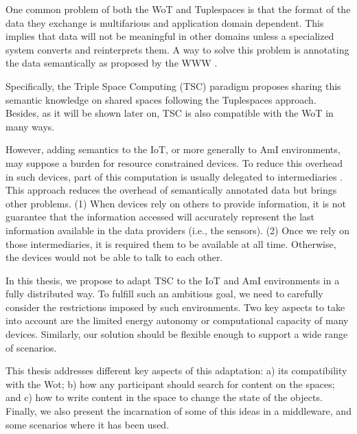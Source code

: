 \medskip

One common problem of both the WoT and Tuplespaces is that the format of the data they exchange is multifarious and application domain dependent.
This implies that data will not be meaningful in other domains unless a specialized system converts and reinterprets them.
A way to solve this problem is annotating the data semantically as proposed by the WWW \cite{berners-lee_semantic_2001}.

Specifically, the Triple Space Computing (TSC) paradigm proposes sharing this semantic knowledge on shared spaces following the Tuplespaces approach.
Besides, as it will be shown later on, TSC is also compatible with the WoT in many ways.

However, adding semantics to the IoT, or more generally to AmI environments, may suppose a burden for resource constrained devices.
To reduce this overhead in such devices, part of this computation is usually delegated to intermediaries \cite{honkola_smart-m3_2010}. %
This approach reduces the overhead of semantically annotated data but brings other problems.
(1) When devices rely on others to provide information, it is not guarantee that the information accessed will accurately represent the last information available in the data providers (i.e., the sensors).
(2) Once we rely on those intermediaries, it is required them to be available at all time.
Otherwise, the devices would not be able to talk to each other.

In this thesis, we propose to adapt TSC to the IoT and AmI environments in a fully distributed way.
To fulfill such an ambitious goal, we need to carefully consider the restrictions imposed by such environments.
Two key aspects to take into account are the limited energy autonomy or computational capacity of many devices.
Similarly, our solution should be flexible enough to support a wide range of scenarios.

This thesis addresses different key aspects of this adaptation:
a) its compatibility with the Wot;
b) how any participant should search for content on the spaces;
and c) how to write content in the space to change the state of the objects.
Finally, we also present the incarnation of some of this ideas in a middleware,
and some scenarios where it has been used.